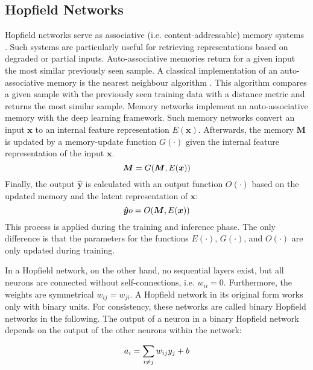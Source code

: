 \subsection{Hopfield Networks}
Hopfield networks serve as associative (i.e. content-addressable) memory systems .
Such systems are particularly useful for retrieving representations based on degraded or partial inputs.
Auto-associative memories return for a given input the most similar previously seen sample.
A classical implementation of an auto-associative memory is the nearest neighbour algorithm .
This algorithm compares a given sample with the previously seen training data with a distance metric and returns the most similar sample.
Memory networks  implement an auto-associative memory with the deep learning framework.
Such memory networks convert an input \(\boldsymbol{x}\) to an internal feature representation \(E(\boldsymbol{x})\). Afterwards, the memory $\boldsymbol{M}$ is updated by a memory-update function $G(\cdot)$ given the internal feature representation of the input \(\boldsymbol{x}\).
%
\begin{equation}\eqlbl{hf_0}
	\boldsymbol{M}=G(\boldsymbol{M}, E(\boldsymbol{x}))
\end{equation}
%
Finally, the output $\boldsymbol{\hat{y}}$ is calculated with an output function $O(\cdot)$ based on the updated memory and the latent representation of \(\boldsymbol{x}\):
%
\begin{equation}\eqlbl{hf_00}
	\boldsymbol{\hat{y}}o=O(\boldsymbol{M}, E(\boldsymbol{x}))
\end{equation}
%
This process is applied during the training and inference phase.
The only difference is that the parameters for the functions \(E(\cdot)\), \(G(\cdot)\), and \(O(\cdot)\) are only updated during training.

In a Hopfield network, on the other hand, no sequential layers exist, but all neurons are connected without self-connections, i.e. \(w_{ii}=0\).
Furthermore, the weights are symmetrical \(w_{ij} = w_{ji}\).
A Hopfield network in its original form works only with binary units.
For consistency, these networks are called binary Hopfield networks in the following.
The output of a neuron in a binary Hopfield network depends on the output of the other neurons within the network:

\begin{equation}\eqlbl{hf_1}
	a_i = \sum_{i \neq j} w_{ij} y_j + b
\end{equation}

